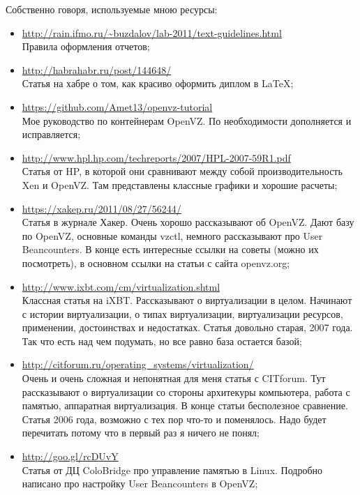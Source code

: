 Собственно говоря, используемые мною ресурсы:
\begin{itemize}
    \item \url{http://rain.ifmo.ru/~buzdalov/lab-2011/text-guidelines.html} \\
    Правила оформления отчетов;
    \item \url{http://habrahabr.ru/post/144648/} \\
    Статья на хабре о том, как красиво оформить диплом в LaTeX;
    \item \url{https://github.com/Amet13/openvz-tutorial} \\
    Мое руководство по контейнерам OpenVZ.
    По необходимости дополняется и исправляется;
    \item \url{http://www.hpl.hp.com/techreports/2007/HPL-2007-59R1.pdf} \\
    Статья от HP, в которой они сравнивают между собой производительность Xen и OpenVZ.
    Там представлены классные графики и хорошие расчеты;
    \item \url{https://xakep.ru/2011/08/27/56244/} \\
    Статья в журнале Хакер.
    Очень хорошо рассказывают об OpenVZ.
    Дают базу по OpenVZ, основные команды vzctl, немного рассказывают про User Beancounters.
    В конце есть интересные ссылки на советы (можно их посмотреть), в основном ссылки на статьи с сайта openvz.org;
    \item \url{http://www.ixbt.com/cm/virtualization.shtml} \\
    Классная статья на iXBT.
    Рассказывают о виртуализации в целом.
    Начинают с истории виртуализации, о типах виртуализации, виртуализации ресурсов, применении, достоинствах и недостатках.
    Статья довольно старая, 2007 года. Так что есть над чем подумать, но все равно база остается базой;
    \item \url{http://citforum.ru/operating_systems/virtualization/} \\
    Очень и очень сложная и непонятная для меня статья с CITforum.
    Тут рассказывают о виртуализации со стороны архитекуры компьютера, работа с памятью, аппаратная виртуализация.
    В конце статьи бесполезное сравнение.
    Статья 2006 года, возможно с тех пор что-то и поменялось.
    Надо будет перечитать потому что в первый раз я ничего не понял;
    \item \url{http://goo.gl/rcDUvY} \\
    Статья от ДЦ ColoBridge про управление памятью в Linux.
    Подробно написано про настройку User Beancounters в OpenVZ;

\end{itemize}
